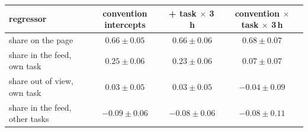 \begin{tabular}{lccc}
\toprule
regressor & convention intercepts & + task $\times$ 3\,h & convention $\times$ task $\times$ 3\,h \\
\midrule
share on the page & $0.66 \pm 0.05$ & $0.66 \pm 0.06$ & $0.68 \pm 0.07$ \\
share in the feed, own task & $0.25 \pm 0.06$ & $0.23 \pm 0.06$ & $0.07 \pm 0.07$ \\
share out of view, own task & $0.03 \pm 0.05$ & $0.03 \pm 0.05$ & $-0.04 \pm 0.09$ \\
share in the feed, other tasks & $-0.09 \pm 0.06$ & $-0.08 \pm 0.06$ & $-0.08 \pm 0.11$ \\
\bottomrule
\end{tabular}
